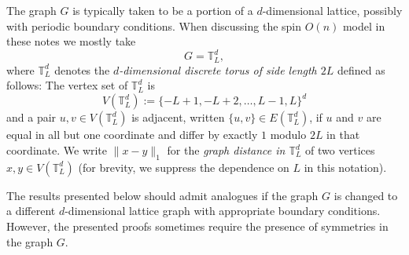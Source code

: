 \documentclass[12pt,reqno]{article}
\def\T{\mathbb{T}}
\begin{document}
The graph $G$ is typically taken to be a portion of a
$d$-dimensional lattice, possibly with periodic boundary
conditions. When discussing the spin $O(n)$ model in these notes we
mostly take
\begin{equation*}
  G = \T_L^d,
\end{equation*}
where $\T_{L}^d$ denotes the \emph{$d$-dimensional discrete torus of
side length $2L$} defined as follows: The vertex set of $\T_L^d$ is
\begin{equation}\label{eq:vertex_set_of_T_L_d}
V(\T_L^d):=\{-L+1,-L+2,\ldots,L-1,L\}^{d}
\end{equation}
and a pair $u,v\in V(\T_L^d)$ is adjacent, written $\{u,v\}\in
E(\T_L^d)$, if $u$ and $v$ are equal in all but one coordinate and
differ by exactly $1$ modulo $2L$ in that coordinate. We write
$\|x-y\|_1$ for the \emph{graph distance in $\T_L^d$} of two
vertices $x,y\in V(\T_L^d)$ (for brevity, we suppress the dependence
on $L$ in this notation).

The results presented below should admit analogues if the graph $G$
is changed to a different $d$-dimensional lattice graph with
appropriate boundary conditions. However, the presented proofs
sometimes require the presence of symmetries in the graph $G$.
\end{document}
